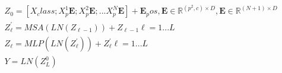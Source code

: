 \documentclass{article}
\begin{document}
\begin{equation}
    \begin{aligned}
    &Z_0 = [X_class;X_p^1\mathbf{E};X_p^2\mathbf{E};...X_p^N\mathbf{E}] + \mathbf{E}_pos, \mathbf{E} \in \mathbb{R}^{(p^2,c)×D},\mathbf{E} \in \mathbb{R}^{(N+1)×D}\\
    &Z_\ell^{'} = MSA(LN(Z_{\ell-1})) + Z_{\ell-1} \ell = 1 ... L\\
    &Z_\ell = MLP(LN(Z_\ell^{'})) + Z_{\ell}^{'} \ell = 1 ... L\\
    &Y = LN(Z_L^0)
    \end{aligned}
    \end{equation}
\end{document}
